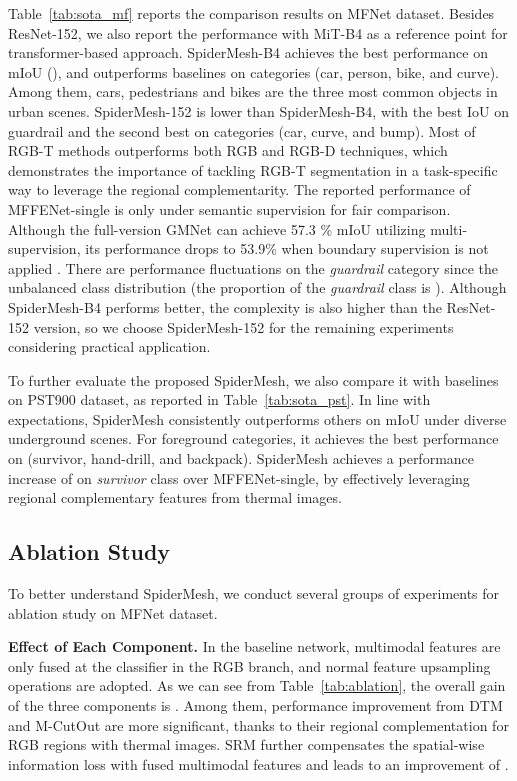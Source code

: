 \documentclass[letterpaper, 10 pt, conference]{ieeeconf}
\begin{document}
Table~\ref{tab:sota_mf} reports the comparison results on MFNet dataset. Besides ResNet-152, we also report the performance with MiT-B4 as a reference point for transformer-based approach. SpiderMesh-B4 achieves the best performance on mIoU (), and outperforms baselines on  categories (car, person, bike, and curve). Among them, cars, pedestrians and bikes are the three most common objects in urban scenes. SpiderMesh-152 is  lower than SpiderMesh-B4, with the best IoU on guardrail and the second best on  categories (car, curve, and bump). Most of RGB-T methods outperforms both RGB and RGB-D techniques, which demonstrates the importance of tackling RGB-T segmentation in a task-specific way to leverage the regional complementarity. The reported performance of MFFENet-single \cite{mffenet} is only under semantic supervision for fair comparison. Although the full-version GMNet can achieve 57.3 \% mIoU utilizing multi-supervision, its performance drops to 53.9\% when boundary supervision is not applied \cite{gmnet}. There are performance fluctuations on the \textit{guardrail} category since the unbalanced class distribution (the proportion of the \textit{guardrail} class is  \cite{mffenet}). Although SpiderMesh-B4 performs better, the complexity is also higher than the ResNet-152 version, so we choose SpiderMesh-152 for the remaining experiments considering practical application.





To further evaluate the proposed SpiderMesh, we also compare it with baselines on PST900 dataset, as reported in Table~\ref{tab:sota_pst}. In line with expectations, SpiderMesh consistently outperforms others on mIoU under diverse underground scenes. For  foreground categories, it achieves the best performance on  (survivor, hand-drill, and backpack). SpiderMesh achieves a performance increase of  on \textit{survivor} class over MFFENet-single, by effectively leveraging regional complementary features from thermal images.


\subsection{Ablation Study}

To better understand SpiderMesh, we conduct several groups of experiments for ablation study on MFNet dataset.

\textbf{Effect of Each Component.} In the baseline network, multimodal features are only fused at the classifier in the RGB branch, and normal feature upsampling operations are adopted. As we can see from Table~\ref{tab:ablation}, the overall gain of the three components is . Among them, performance improvement from DTM and M-CutOut are more significant, thanks to their regional complementation for RGB regions with thermal images. SRM further compensates the spatial-wise information loss with fused multimodal features and leads to an improvement of .
\end{document}
